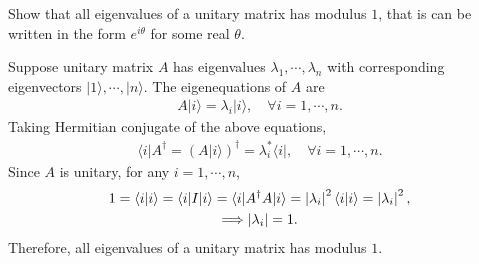 \documentclass[en]{sol-man}
\begin{document}
\begin{exe}
    Show that all eigenvalues of a unitary matrix has modulus $1$, that is can be written in the form $e^{i\theta}$ for some real $\theta$.
\end{exe}
\begin{pf}
    Suppose unitary matrix $A$ has eigenvalues $\lambda_1,\cdots,\lambda_n$ with corresponding eigenvectors $\lvert 1\rangle,\cdots,\lvert n\rangle$. The eigenequations of $A$ are
    \begin{align}
        A\lvert i\rangle=\lambda_i\lvert i\rangle,\quad\forall i=1,\cdots,n.
    \end{align}
    Taking Hermitian conjugate of the above equations,
    \begin{align}
        \langle i\rvert A^{\dagger}=(A\lvert i\rangle)^{\dagger}=\lambda_i^*\langle i\rvert,\quad\forall i=1,\cdots,n.
    \end{align}
    Since $A$ is unitary, for any $i=1,\cdots,n$,
    \begin{gather}
        1=\langle i\vert i\rangle=\langle i\rvert I\lvert i\rangle=\langle i\rvert A^{\dagger}A\lvert i\rangle=\left\lvert\lambda_i\right\rvert^2\langle i\vert i\rangle=\left\lvert\lambda_i\right\rvert^2,\\
        \Longrightarrow\left\lvert\lambda_i\right\rvert=1.
    \end{gather}
    Therefore, all eigenvalues of a unitary matrix has modulus $1$.
\end{pf}
\end{document}
